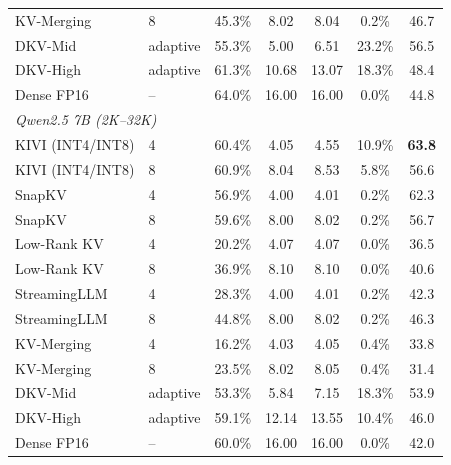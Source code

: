 \begin{tabular}{ll ccc c c}
KV-Merging & 8 & 45.3\% & 8.02 & 8.04 & 0.2\% & 46.7 \\
DKV-Mid & adaptive & 55.3\% & 5.00 & 6.51 & 23.2\% & 56.5 \\
DKV-High & adaptive & 61.3\% & 10.68 & 13.07 & 18.3\% & 48.4 \\
Dense FP16 & -- & 64.0\% & 16.00 & 16.00 & 0.0\% & 44.8 \\
\midrule
\multicolumn{7}{l}{\textit{Qwen2.5 7B (2K--32K)}} \\
\midrule
KIVI (INT4/INT8) & 4 & 60.4\% & 4.05 & 4.55 & 10.9\% & \textbf{63.8} \\
KIVI (INT4/INT8) & 8 & 60.9\% & 8.04 & 8.53 & 5.8\% & 56.6 \\
SnapKV & 4 & 56.9\% & 4.00 & 4.01 & 0.2\% & 62.3 \\
SnapKV & 8 & 59.6\% & 8.00 & 8.02 & 0.2\% & 56.7 \\
Low-Rank KV & 4 & 20.2\% & 4.07 & 4.07 & 0.0\% & 36.5 \\
Low-Rank KV & 8 & 36.9\% & 8.10 & 8.10 & 0.0\% & 40.6 \\
StreamingLLM & 4 & 28.3\% & 4.00 & 4.01 & 0.2\% & 42.3 \\
StreamingLLM & 8 & 44.8\% & 8.00 & 8.02 & 0.2\% & 46.3 \\
KV-Merging & 4 & 16.2\% & 4.03 & 4.05 & 0.4\% & 33.8 \\
KV-Merging & 8 & 23.5\% & 8.02 & 8.05 & 0.4\% & 31.4 \\
DKV-Mid & adaptive & 53.3\% & 5.84 & 7.15 & 18.3\% & 53.9 \\
DKV-High & adaptive & 59.1\% & 12.14 & 13.55 & 10.4\% & 46.0 \\
Dense FP16 & -- & 60.0\% & 16.00 & 16.00 & 0.0\% & 42.0 \\
\bottomrule
\end{tabular}
